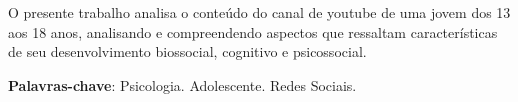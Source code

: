 
\setlength{\absparsep}{18pt} %
\begin{resumo}
 O presente trabalho analisa o conteúdo do canal de youtube de uma jovem dos 13 aos 18 anos, analisando e compreendendo aspectos que ressaltam características  de seu desenvolvimento biossocial, cognitivo e psicossocial.

 \textbf{Palavras-chave}: Psicologia. Adolescente. Redes Sociais.
\end{resumo}
